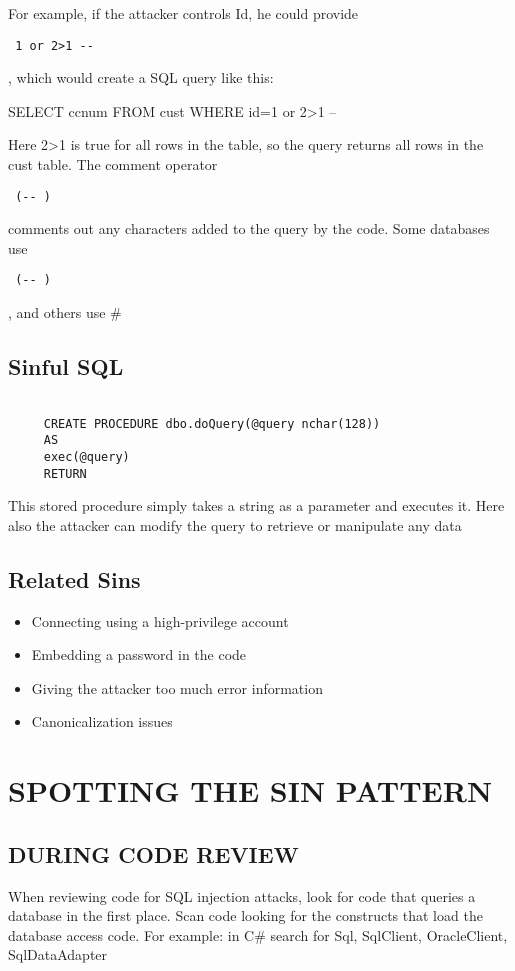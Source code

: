 \documentclass[a4paper, 11pt]{article} %
\begin{document}
	For example, if the attacker controls Id, he
	could provide  \begin{verbatim} 1 or 2>1 --\end{verbatim} ,
	 which would create a SQL query like this:
	 
	 SELECT ccnum FROM cust WHERE id=1 or 2>1 --
	
	Here 2>1 is true for all rows in the table, so the query returns all rows in the cust table.
	The comment operator\begin{verbatim} (-- )\end{verbatim} comments out any characters added to the query by the
	code. Some databases use \begin{verbatim} (-- )\end{verbatim} , and others use \#
	 
	 
	 \subsection*{Sinful SQL}
	 \begin{verbatim}
	 
	 CREATE PROCEDURE dbo.doQuery(@query nchar(128))
	 AS
	 exec(@query)
	 RETURN
	 \end{verbatim}
	 This stored procedure simply takes a string as a parameter and executes it. Here also the attacker can modify the query to retrieve or manipulate any data
	
	\subsection*{Related Sins}
	\begin{itemize}
		\item Connecting using a high-privilege account
		\item  Embedding a password in the code
		\item Giving the attacker too much error information
		\item Canonicalization issues
	\end{itemize}
	
	\section*{SPOTTING THE SIN PATTERN}
	\subsection*{DURING CODE REVIEW}
	When reviewing code for SQL injection attacks, look for code that queries a database in
	the first place. Scan code looking for the constructs that load the database access code. For example: in C\# search for Sql, SqlClient, OracleClient, SqlDataAdapter
	
\end{document}
